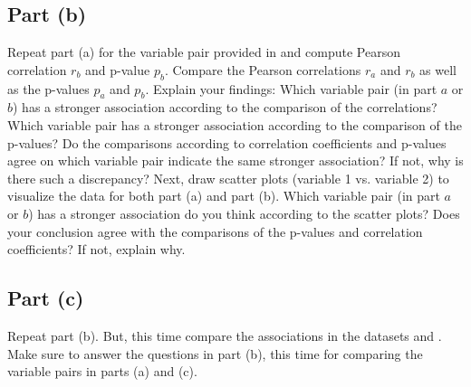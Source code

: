 \documentclass[11pt]{article}
\begin{document}
\subsection{Part (b)}
Repeat part (a) for the variable pair provided in \filenameD and compute Pearson correlation $r_b$ and p-value $p_b$. Compare the Pearson correlations $r_a$ and $r_b$ as well as the p-values $p_a$ and $p_b$. Explain your findings: Which variable pair (in part $a$ or $b$) has a stronger association according to the comparison of the correlations? Which variable pair has a stronger association according to the comparison of the p-values? Do the comparisons according to correlation coefficients and p-values agree on which variable pair indicate the same stronger association? If not, why is there such a discrepancy? Next, draw scatter plots (variable 1 vs. variable 2) to visualize  the data for both part (a) and part (b). Which variable pair (in part $a$ or $b$) has a stronger association do you think according to the scatter plots? Does your conclusion agree with the comparisons of the p-values and correlation coefficients? If not, explain why.

\subsection{Part (c)}

Repeat part (b). But, this time compare the associations in the datasets \filenameC and \filenameE. Make sure to answer the questions in part (b), this time for comparing the variable pairs in parts (a) and (c).
\end{document}
